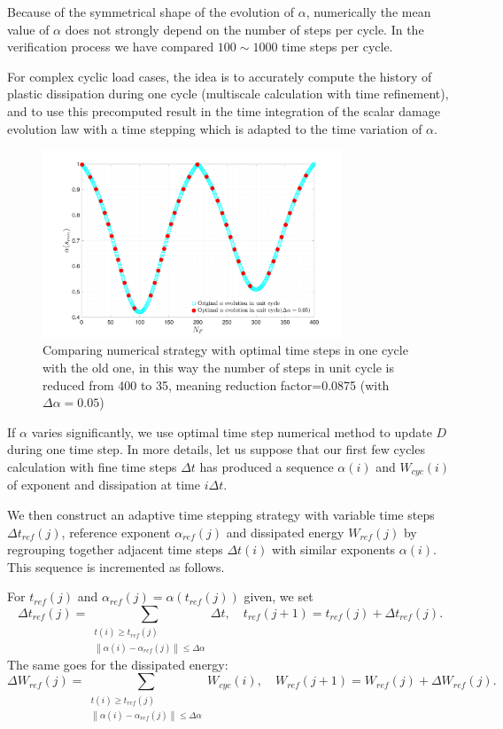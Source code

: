 Because of the symmetrical shape of the evolution of $\alpha$, numerically the mean value of $\alpha$ does not strongly depend on the number of steps per cycle. In the verification process we have compared $100\sim1000$ time steps per cycle. 

For complex cyclic load cases, the idea is to accurately compute the history of plastic dissipation during one cycle (multiscale calculation with time refinement), and to use this precomputed result in the time integration of the scalar damage evolution law with a time stepping which is adapted to the time variation of $\alpha$. 

\begin{figure}[!h]
	\centering
	\includegraphics[width=0.8\textwidth]{figures//alpha_opt_vs_alpha_stepnumber.png} 
	\caption{Comparing numerical strategy with optimal time steps in one cycle with the old one, in this way the number of steps in unit cycle is reduced from 400 to 35, meaning reduction factor=0.0875 (with $\Delta\alpha=0.05$)}
	\label{fig.alpha_opt_vs_alpha_stepnumber}
\end{figure}

If $\alpha$ varies significantly, we use optimal time step numerical method to update $D$ during one time step. In more details, let us suppose that our first few cycles calculation with fine time steps $\Delta t$ has produced a sequence $\alpha(i)$ and $W_{cyc}(i)$ of exponent and dissipation at time $i\Delta t$.

We then construct an adaptive time stepping strategy with variable time steps $\Delta t_{ref}(j)$, reference exponent $\alpha_{ref}(j)$ and dissipated energy $W_{ref}(j)$ by regrouping together adjacent time steps $\Delta t(i)$ with similar exponents $\alpha(i)$. This sequence is incremented as follows.


For $t_{ref}(j)$ and $\alpha_{ref}(j)=\alpha(t_{ref}(j))$ given, we set
$$\Delta t_{ref}(j)=\sum_{\substack{t(i)\geqslant t_{ref}(j)\\\left\| \alpha(i)-\alpha_{ref}(j)\right\|\leqslant \Delta\alpha }}\Delta t, \quad t_{ref}(j+1)=t_{ref}(j)+\Delta t_{ref}(j).$$
The same goes for the dissipated energy:
$$\Delta W_{ref}(j)=\sum_{\substack{t(i)\geqslant t_{ref}(j)\\\left\| \alpha(i)-\alpha_{ref}(j)\right\|\leqslant \Delta\alpha} }W_{cyc}(i) , \quad W_{ref}(j+1)=W_{ref}(j)+\Delta W_{ref}(j).$$

